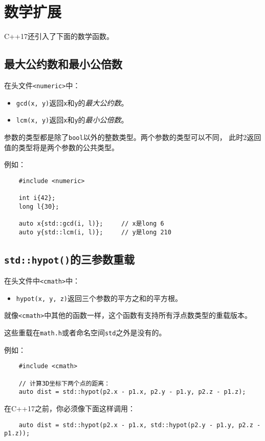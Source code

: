 \section{数学扩展}
C++17还引入了下面的数学函数。

\subsection{最大公约数和最小公倍数}
在头文件\texttt{<numeric>}中：
\begin{itemize}
    \item \texttt{gcd(x, y)}返回\texttt{x}和\texttt{y}的\emph{最大公约数}。
    \item \texttt{lcm(x, y)}返回\texttt{x}和\texttt{y}的\emph{最小公倍数}。
\end{itemize}
参数的类型都是除了\texttt{bool}以外的整数类型。两个参数的类型可以不同，
此时2返回值的类型将是两个参数的公共类型。

例如：
\begin{lstlisting}
    #include <numeric>

    int i{42};
    long l{30};

    auto x{std::gcd(i, l)};     // x是long 6
    auto y{std::lcm(i, l)};     // y是long 210
\end{lstlisting}

\subsection{\texttt{std::hypot()}的三参数重载}
在头文件中\texttt{<cmath>}中：
\begin{itemize}
    \item \texttt{hypot(x, y, z)}返回三个参数的平方之和的平方根。
\end{itemize}
就像\texttt{<cmath>}中其他的函数一样，这个函数有支持所有浮点数类型的重载版本。

这些重载在\texttt{math.h}或者命名空间\texttt{std}之外是没有的。

例如：
\begin{lstlisting}
    #include <cmath>

    // 计算3D坐标下两个点的距离：
    auto dist = std::hypot(p2.x - p1.x, p2.y - p1.y, p2.z - p1.z);
\end{lstlisting}
在C++17之前，你必须像下面这样调用：
\begin{lstlisting}
    auto dist = std::hypot(p2.x - p1.x, std::hypot(p2.y - p1.y, p2.z - p1.z));
\end{lstlisting}

